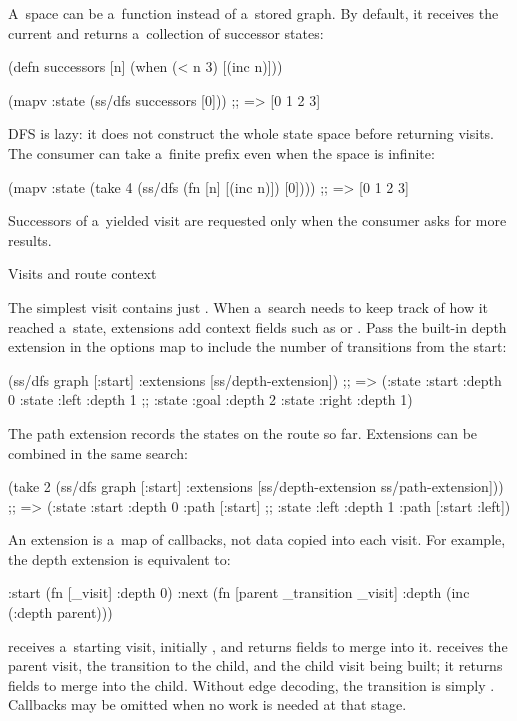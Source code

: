 A~space can be a~function instead of a~stored graph. By default, it receives
the current  and returns a~collection of successor states:

\begtt {}
(defn successors [n]
  (when (< n 3)
    [(inc n)]))

(mapv :state (ss/dfs successors [0]))
;; => [0 1 2 3]
\endtt

DFS is lazy: it does not construct the whole state space before returning
visits. The consumer can take a~finite prefix even when the space is infinite:

\begtt {}
(mapv :state
      (take 4 (ss/dfs (fn [n] [(inc n)]) [0])))
;; => [0 1 2 3]
\endtt

Successors of a~yielded visit are requested only when the consumer asks for
more results.

\secc[context] Visits and route context

The simplest visit contains just . When a~search needs to keep
track of how it reached a~state, extensions add context fields such as
 or . Pass the built-in depth extension in the
options map to include the number of transitions from the start:

\begtt {}
(ss/dfs graph [:start]
        {:extensions [ss/depth-extension]})
;; => ({:state :start :depth 0} {:state :left :depth 1}
;;     {:state :goal :depth 2} {:state :right :depth 1})
\endtt

The path extension records the states on the route so far. Extensions can
be combined in the same search:

\begtt {}
(take 2 (ss/dfs graph [:start]
                {:extensions [ss/depth-extension
                              ss/path-extension]}))
;; => ({:state :start :depth 0 :path [:start]}
;;     {:state :left :depth 1 :path [:start :left]})
\endtt

An extension is a~map of callbacks, not data copied into each visit. For
example, the depth extension is equivalent to:

\begtt {}
{:start (fn [_visit] {:depth 0})
 :next  (fn [parent _transition _visit]
          {:depth (inc (:depth parent))})}
\endtt

 receives a~starting visit, initially ,
and returns fields to merge into it.  receives the parent visit,
the transition to the child, and the child visit being built; it returns
fields to merge into the child.
Without edge decoding, the transition is simply .
Callbacks may be omitted when no work is needed at that stage.

